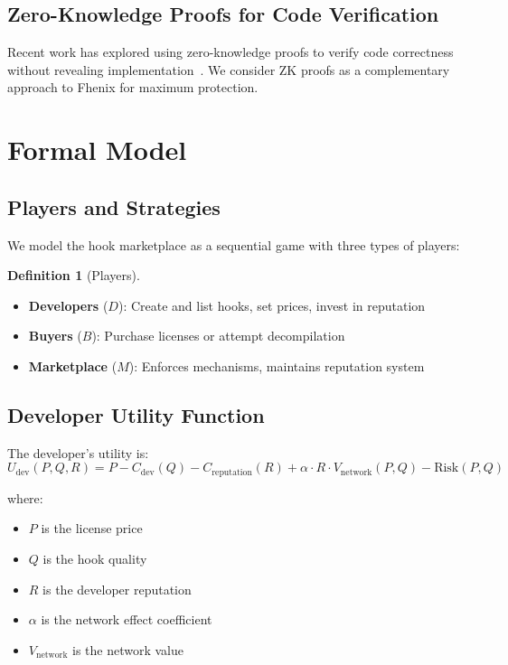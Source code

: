 \documentclass[11pt,a4paper]{article}
\theoremstyle{definition}
\newtheorem{definition}{Definition}[section]
\theoremstyle{remark}
\newcommand{\developer}{\text{dev}}
\begin{document}
\subsection{Zero-Knowledge Proofs for Code Verification}

Recent work has explored using zero-knowledge proofs to verify code correctness without revealing implementation~\cite{raziel2018}. We consider ZK proofs as a complementary approach to Fhenix for maximum protection.


\section{Formal Model}
\label{sec:model}

\subsection{Players and Strategies}

We model the hook marketplace as a sequential game with three types of players:

\begin{definition}[Players]
\begin{itemize}
    \item \textbf{Developers} ($D$): Create and list hooks, set prices, invest in reputation
    \item \textbf{Buyers} ($B$): Purchase licenses or attempt decompilation
    \item \textbf{Marketplace} ($M$): Enforces mechanisms, maintains reputation system
\end{itemize}
\end{definition}

\subsection{Developer Utility Function}

The developer's utility is:
\begin{equation}
U_{\developer}(P, Q, R) = P - C_{\developer}(Q) - C_{\text{reputation}}(R) + \alpha \cdot R \cdot V_{\text{network}}(P, Q) - \text{Risk}(P, Q)
\end{equation}

where:
\begin{itemize}
    \item $P$ is the license price
    \item $Q$ is the hook quality
    \item $R$ is the developer reputation
    \item $\alpha$ is the network effect coefficient
    \item $V_{\text{network}}$ is the network value
\end{itemize}
\end{document}
